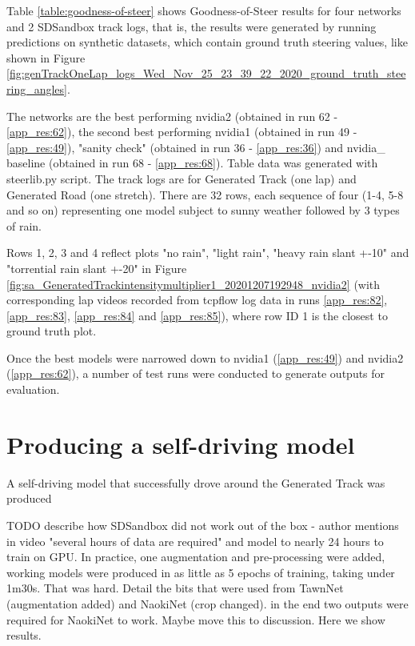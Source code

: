 Table \ref{table:goodness-of-steer} shows Goodness-of-Steer results for four networks and 2 SDSandbox track logs, that is, the results were generated by running predictions on synthetic datasets, which contain ground truth steering values, like shown in Figure \ref{fig:genTrackOneLap_logs_Wed_Nov_25_23_39_22_2020_ground_truth_steering_angles}. 

The networks are the best performing nvidia2 (obtained in run 62 - \ref{app_res:62}), the second best performing nvidia1 (obtained in run 49 - \ref{app_res:49}), "sanity check" (obtained in run 36 - \ref{app_res:36}) and nvidia\_ baseline (obtained in run 68 - \ref{app_res:68}). Table data was generated with steerlib.py script. The track logs are for Generated Track (one lap) and Generated Road (one stretch). There are 32 rows, each sequence of four (1-4, 5-8 and so on) representing one model subject to sunny weather followed by 3 types of rain. 

Rows 1, 2, 3 and 4 reflect plots "no rain", "light rain", "heavy rain slant +-10" and "torrential rain slant +-20" in Figure \ref{fig:sa_GeneratedTrackintensitymultiplier1_20201207192948_nvidia2} (with corresponding lap videos recorded from tcpflow log data in runs \ref{app_res:82}, \ref{app_res:83}, \ref{app_res:84} and  \ref{app_res:85}), where row ID 1 is the closest to ground truth plot. 




Once the best models were narrowed down to nvidia1 (\ref{app_res:49}) and nvidia2 (\ref{app_res:62}), a number of test runs were conducted to generate outputs for evaluation. 



    
\section{Producing a self-driving model}
A self-driving model that successfully drove around the Generated Track was produced 


TODO describe how SDSandbox did not work out of the box - author mentions in video "several hours of data are required" and model to nearly 24 hours to train on GPU. In practice, one augmentation and pre-processing were added, working models were produced in as little as 5 epochs of training, taking under 1m30s.
That was hard. Detail the bits that were used from TawnNet (augmentation added) and NaokiNet (crop changed). in the end two outputs were required for NaokiNet to work. Maybe move this to discussion. Here we show results.

